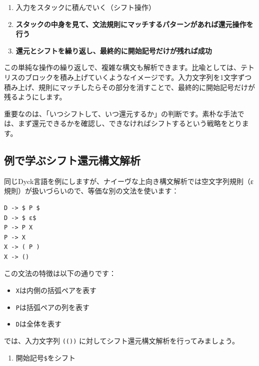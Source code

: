 \begin{enumerate}
\def\labelenumi{\arabic{enumi}.}
\tightlist
\item
  入力をスタックに積んでいく（シフト操作）
\item
  \textbf{スタックの中身を見て、文法規則にマッチするパターンがあれば還元操作を行う}
\item
  \textbf{還元とシフトを繰り返し、最終的に開始記号だけが残れば成功}
\end{enumerate}

この単純な操作の繰り返しで、複雑な構文も解析できます。比喩としては、テトリスのブロックを積み上げていくようなイメージです。入力文字列を1文字ずつ積み上げ、規則にマッチしたらその部分を消すことで、最終的に開始記号だけが残るようにします。

重要なのは、「いつシフトして、いつ還元するか」の判断です。素朴な手法では、まず還元できるかを確認し、できなければシフトするという戦略をとります。

\hypertarget{chapter5-ux4f8bux3067ux5b66ux3076ux30b7ux30d5ux30c8ux9084ux5143ux69cbux6587ux89e3ux6790}{%
\subsection{例で学ぶシフト還元構文解析}\label{chapter5-ux4f8bux3067ux5b66ux3076ux30b7ux30d5ux30c8ux9084ux5143ux69cbux6587ux89e3ux6790}}

同じDyck言語を例にしますが、ナイーヴな上向き構文解析では空文字列規則（ε規則）が扱いづらいので、等価な別の文法を使います：

\begin{verbatim}
D -> $ P $
D -> $ ε$
P -> P X
P -> X
X -> ( P )
X -> ()
\end{verbatim}

この文法の特徴は以下の通りです：

\begin{itemize}
\tightlist
\item
  \texttt{X}は内側の括弧ペアを表す
\item
  \texttt{P}は括弧ペアの列を表す
\item
  \texttt{D}は全体を表す
\end{itemize}

では、入力文字列 \texttt{(())}
に対してシフト還元構文解析を行ってみましょう。

\begin{enumerate}
\def\labelenumi{\arabic{enumi}.}
\tightlist
\item
  開始記号\texttt{\$}をシフト
\end{enumerate}

